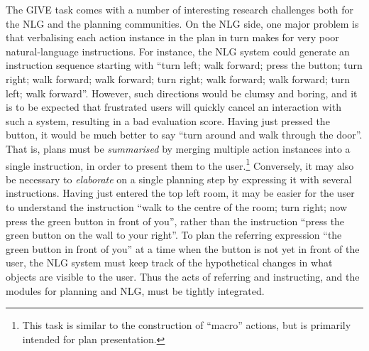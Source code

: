 The GIVE task comes with a number of interesting research challenges
both for the NLG and the planning communities.  On the NLG side, one
major problem is that verbalising each action instance in the plan in
turn makes for very poor natural-language instructions.  For instance,
the NLG system could generate an instruction sequence starting with
``turn left; walk forward; press the button; turn right; walk forward;
walk forward; turn right; walk forward; walk forward; turn left; walk
forward''.  However, such directions would be clumsy and boring, and
it is to be expected that frustrated users will quickly cancel an
interaction with such a system, resulting in a bad evaluation score.
Having just pressed the button, it would be much better to say ``turn
around and walk through the door''. That is, plans must be
\emph{summarised} by merging multiple action instances into a single
instruction, in order to present them to the user.\footnote{This task
  is similar to the construction of ``macro'' actions, but is
  primarily intended for plan presentation.}  Conversely, it may also
be necessary to \emph{elaborate} on a single planning step by
expressing it with several instructions.  Having just entered the top
left room, it may be easier for the user to understand the instruction
``walk to the centre of the room; turn right; now press the green
button in front of you'', rather than the instruction ``press the
green button on the wall to your right''.  To plan the referring
expression ``the green button in front of you'' at a time when the
button is not yet in front of the user, the NLG system must keep track
of the hypothetical changes in what objects are visible to the user.
Thus the acts of referring and instructing, and the modules for
planning and NLG, must be tightly integrated.

